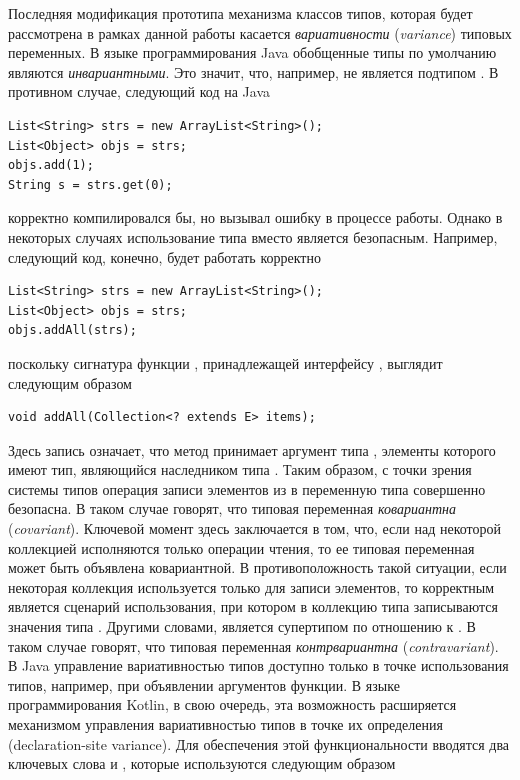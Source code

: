Последняя модификация прототипа механизма классов типов, которая будет рассмотрена в рамках данной работы касается \emph{вариативности} (\emph{variance}) типовых переменных. В языке программирования Java обобщенные типы по умолчанию являются \emph{инвариантными}. Это значит, что, например,  не является подтипом . В противном случае, следующий код на Java 
\begin{lstlisting}[style=wo_caption]
List<String> strs = new ArrayList<String>();
List<Object> objs = strs;
objs.add(1);
String s = strs.get(0);
\end{lstlisting}
корректно компилировался бы, но вызывал ошибку в процессе работы. Однако в некоторых случаях использование типа  вместо  является безопасным. Например, следующий код, конечно, будет работать корректно
\begin{lstlisting}[style=wo_caption]
List<String> strs = new ArrayList<String>();
List<Object> objs = strs;
objs.addAll(strs);
\end{lstlisting}
поскольку сигнатура функции , принадлежащей интерфейсу , выглядит следующим образом
\begin{lstlisting}[style=wo_caption]
void addAll(Collection<? extends E> items);
\end{lstlisting}
Здесь запись  означает, что метод принимает аргумент типа , элементы которого имеют тип, являющийся наследником типа . Таким образом, с точки зрения системы типов операция записи элементов из  в переменную типа  совершенно безопасна. В таком случае говорят, что типовая переменная  \emph{ковариантна} (\emph{covariant}). Ключевой момент здесь заключается в том, что, если над некоторой коллекцией исполняются только операции чтения, то ее типовая переменная может быть объявлена ковариантной. В противоположность такой ситуации, если некоторая коллекция используется только для записи элементов, то корректным является сценарий использования, при котором в коллекцию типа  записываются значения типа . Другими словами,  является супертипом по отношению к . В таком случае говорят, что типовая переменная \emph{контрвариантна} (\emph{contravariant}). В Java управление вариативностью типов доступно только в точке использования типов, например, при объявлении аргументов функции. В языке программирования Kotlin, в свою очередь, эта возможность расширяется механизмом управления вариативностью типов в точке их определения (declaration-site variance). Для обеспечения этой функциональности вводятся два ключевых слова  и , которые используются следующим образом
